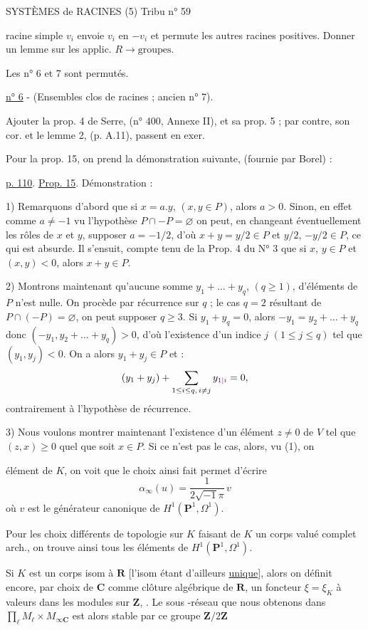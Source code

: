 
SYSTÈMES de RACINES (5) \hfill Tribu n° 59

racine simple $v_i$ envoie $v_i$ en $-v_i$ et permute les autres racines positives. Donner un lemme sur les applic. $R\longrightarrow\text{groupes}$.

Les n° 6 et 7 sont permutés.

\uline{n° 6} - (Ensembles clos de racines ; ancien n° 7).

Ajouter la prop. 4 de Serre, (n° 400, Annexe II), et sa prop. 5 ; par contre, son cor. et le lemme 2, (p. A.11), passent en exer.

Pour la prop. 15, on prend la démonstration suivante, (fournie par Borel) :

\uline{p. 110}. \uline{Prop. 15}. Démonstration :

1) Remarquons d'abord que si $x=a.y$, $(x,y\in P)$, alors $a>0$. Sinon, en effet comme $a\ne-1$ vu l'hypothèse $P\cap-P=\varnothing$ on peut, en changeant éventuellement les rôles de $x$ et $y$, supposer $a=-1/2$, d'où $x+y=y/2\in P$ et $y/2$, $-y/2\in P$, ce qui est absurde. Il s'ensuit, compte tenu de la Prop. 4 du N° 3 que si $x$, $y\in P$ et $(x,y)<0$, alors $x+y\in P$.

2) Montrons maintenant qu'aucune somme $y_1+\ldots+y_q$, $(q\geq1)$, d'éléments de $P$ n'est nulle. On procède par récurrence sur $q$ ; le cas $q=2$ résultant de $P\cap(-P)=\varnothing$, on peut supposer $q\geq3$. Si $y_1+y_q=0$, alors $-y_1=y_2+\ldots+y_q$ donc $(-y_1,y_2+\ldots+y_q)>0$, d'où l'existence d'un indice $j$ $(1\leq j\leq q)$ tel que $(y_1,y_j)<0$. On a alors $y_1+y_j\in P$ et :
\[
 (y_1+y_j)+\sum_{1\leq i\leq q,\,i\ne j}y_{\unsure{1|i}}=0,
\]
contrairement à l'hypothèse de récurrence.

3) Nous voulons montrer maintenant l'existence d'un élément $z\ne0$ de $V$ tel que $(z,x)\geq0$ quel que soit $x\in P$. Si ce n'est pas le cas, alors, vu (1), on


élément de $K$, on voit que le choix ainsi fait permet d'écrire
\[
 \alpha_\infty(u)=\frac{1}{2\sqrt{-1}\pi}\,v
\]
où $v$ est le générateur canonique de $H^1(\mathbf P^1,\Omega^1)$.

Pour les choix différents de topologie sur $K$ faisant de $K$ un corps valué complet arch., on trouve ainsi tous les éléments  de $H^1(\mathbf P^1,\Omega^1)$.

Si $K$ est un corps  isom à $\mathbf R$ [l'isom étant d'ailleurs \uline{unique}], alors on définit encore, par choix de $\mathbf C$ comme  clôture algébrique de $\mathbf R$, un foncteur $\xi=\xi_K$ à valeurs dans les modules sur $\mathbf Z$,  . Le sous -réseau  que nous obtenons dans $\displaystyle\prod_\ell M_\ell\times M_{\infty\mathbf C}$  est alors stable par ce groupe $\mathbf Z/2\mathbf Z$

